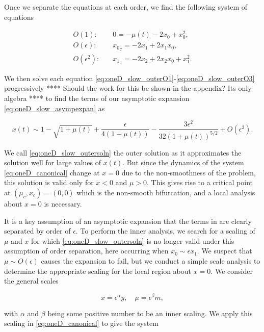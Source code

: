 Once we separate the equations at each order, we find the following system of equations

\begin{align}
\label{eq:oneD_slow_outerO1}
O(1):& \quad 0=-\mu(t)-2x_0+x_0^2,\\
\label{eq:oneD_slow_outerO2}
O(\epsilon):& \quad {x_0}_\tau=-2x_1+2x_1 x_0,\\
\label{eq:oneD_slow_outerO3}
O(\epsilon^2):& \quad {x_1}_\tau=-2x_2+2x_2x_0+x_1^2.
\end{align}

We then solve each equation \eqref{eq:oneD_slow_outerO1}-\eqref{eq:oneD_slow_outerO3} progressively **** Should the work for this be shown in the appendix? Its only algebra **** to find the terms of our asymptotic expansion \eqref{eq:oneD_slow_asympexpan} as

\begin{equation}\label{eq:oneD_slow_outersoln}
x(t)\sim 1-\sqrt{1+\mu(t)}+ \frac{\epsilon}{4(1+\mu(t))}-\frac{3\epsilon^2}{32(1+\mu(t))^{5/2}}+O(\epsilon^3).
\end{equation}

We call \eqref{eq:oneD_slow_outersoln} the outer solution as it approximates the solution well for large values of $x(t)$. But since the dynamics of the system \eqref{eq:oneD_canonical} change at $x=0$ due to the non-smoothness of the problem, this solution is valid only for $x<0$ and $\mu>0$. This gives rise to a critical point at $(\mu_c,x_c)=(0,0)$ which is the non-smooth bifurcation, and a local analysis about $x=0$ is necessary.

It is a key assumption of an asymptotic expansion that the terms in are clearly separated by order of $\epsilon$. To perform the inner analysis, we search for a scaling of $\mu$ and $x$ for which \eqref{eq:oneD_slow_outersoln} is no longer valid under this assumption of order separation, here occurring when $x_0\sim \epsilon x_1$. We suspect that $\mu\sim O(\epsilon)$ causes the expansion to fail, but we conduct a simple scale analysis to determine the appropriate scaling for the local region about $x=0$. We consider the general scales

\begin{equation*}
x=\epsilon^\alpha y,\quad \mu = \epsilon^\beta m,
\end{equation*}

with $\alpha$ and $\beta$ being some positive number to be an inner scaling. We apply this scaling in \eqref{eq:oneD_canonical} to give the system

